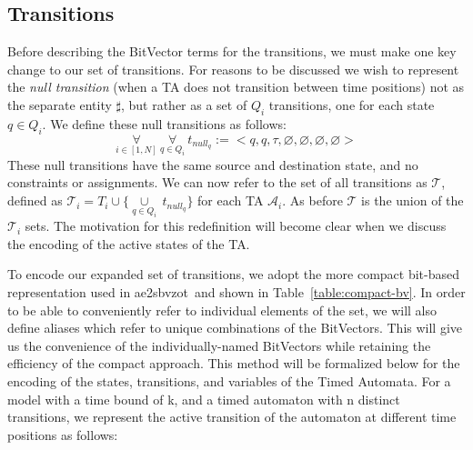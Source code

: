 \documentclass[a4paper,11pt]{report}
\theoremstyle{definition}
\newcommand{\aez}{ae2sbvzot}
\begin{document}

\subsection{Transitions}\label{encoding-transitions}

Before describing the BitVector terms for the transitions, we must make one key
change to our set of transitions. For reasons to be discussed we wish to
represent the \emph{null transition} (when a TA does not transition between time
positions) not as the separate entity \(\sharp\), but rather as a set of
$Q_{i}$ transitions, one for each state $q \in Q_{i}$. We define these null
transitions as follows:
\[\underset{i \in [1,N]}{\forall}\ \underset{q \in Q_{i}}{\forall}\ t_{null_q} := {<}q, q, \tau, \varnothing, \varnothing, \varnothing, \varnothing {>}\]
These null transitions have the same source and destination state, and no
constraints or assignments. We can now refer to the set of all transitions as
\(\mathcal{T}\), defined as
\(\mathcal{T}_{i} = T_{i} \cup \{\underset{q \in Q_{i}}{\cup}\ t_{null_{q}}\}\)
for each TA \(\mathcal{A}_{i}\). As before \(\mathcal{T}\) is the union of the
\(\mathcal{T}_{i}\) sets. The motivation for this redefinition will become clear
when we discuss the encoding of the active states of the TA.


To encode our expanded set of transitions, we adopt the more compact bit-based
representation used in \aez\ and shown in Table~\ref{table:compact-bv}. In order
to be able to conveniently refer to individual elements of the set, we will also
define aliases which refer to unique combinations of the BitVectors. This will
give us the convenience of the individually-named BitVectors while retaining the
efficiency of the compact approach. This method will be formalized below for the
encoding of the states, transitions, and variables of the Timed Automata.
For a model with a time bound of k, and a timed automaton with n distinct
transitions, we represent the active transition of the automaton at different
time positions as follows:
\end{document}
